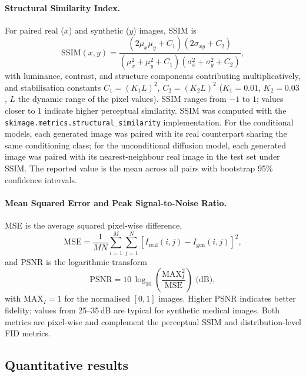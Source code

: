 \documentclass[11pt]{article}
\begin{document}
\paragraph{Structural Similarity Index.}
For paired real ($x$) and synthetic ($y$) images, SSIM\cite{wang2004image} is
\begin{equation}
\text{SSIM}(x,y) = \frac{(2\mu_{x}\mu_{y} + C_{1})(2\sigma_{xy} + C_{2})}{(\mu_{x}^{2} + \mu_{y}^{2} + C_{1})(\sigma_{x}^{2} + \sigma_{y}^{2} + C_{2})},
\label{eq:ssim}
\end{equation}
with luminance, contrast, and structure components contributing multiplicatively, and stabilisation constants $C_{1} = (K_{1}L)^{2}$, $C_{2} = (K_{2}L)^{2}$ ($K_{1}=0.01$, $K_{2}=0.03$, $L$ the dynamic range of the pixel values). SSIM ranges from $-1$ to $1$; values closer to $1$ indicate higher perceptual similarity. SSIM was computed with the \texttt{skimage.metrics.structural\_similarity} implementation. For the conditional models, each generated image was paired with its real counterpart sharing the same conditioning class; for the unconditional diffusion model, each generated image was paired with its nearest-neighbour real image in the test set under SSIM. The reported value is the mean across all pairs with bootstrap 95\% confidence intervals.

\paragraph{Mean Squared Error and Peak Signal-to-Noise Ratio.}
MSE is the average squared pixel-wise difference,
\begin{equation}
\text{MSE} = \frac{1}{MN}\sum_{i=1}^{M}\sum_{j=1}^{N}\left[I_{\text{real}}(i,j) - I_{\text{gen}}(i,j)\right]^{2},
\label{eq:mse}
\end{equation}
and PSNR is the logarithmic transform
\begin{equation}
\text{PSNR} = 10\,\log_{10}\!\left(\frac{\text{MAX}_{I}^{2}}{\text{MSE}}\right) \text{ (dB)},
\label{eq:psnr}
\end{equation}
with $\text{MAX}_{I}=1$ for the normalised $[0,1]$ images. Higher PSNR indicates better fidelity; values from 25--35\,dB are typical for synthetic medical images. Both metrics are pixel-wise and complement the perceptual SSIM and distribution-level FID metrics.

\subsection*{Quantitative results}
\end{document}
